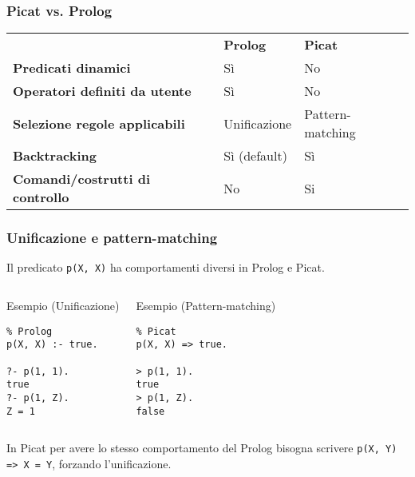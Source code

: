 \documentclass{beamer}
\begin{document}
\begin{frame}[fragile]
  \frametitle{Picat vs. Prolog}
  \begin{table}
    \begin{tabular}{l l l}
      & \textbf{Prolog} & \textbf{Picat} \\
      \addlinespace
      \textbf{Predicati dinamici} & Sì & No \\
      \textbf{Operatori definiti da utente} & Sì & No \\
      \textbf{Selezione regole applicabili} & Unificazione & Pattern-matching \\
      \textbf{Backtracking} & Sì (default) & Sì \\
      \textbf{Comandi/costrutti di controllo} & No & Si
    \end{tabular}
  \end{table}
\end{frame}


\begin{frame}[fragile]
  \frametitle{Unificazione e pattern-matching}
  
  Il predicato \texttt{p(X, X)} ha comportamenti diversi in Prolog e
  Picat.
  \begin{columns}[c]
    
    \begin{exampleblock}{Esempio (Unificazione)}
\begin{verbatim}
% Prolog
p(X, X) :- true.

?- p(1, 1).
true
?- p(1, Z).
Z = 1
\end{verbatim}
    \end{exampleblock}
    
    \begin{exampleblock}{Esempio (Pattern-matching)}
\begin{verbatim}
% Picat
p(X, X) => true.

> p(1, 1).
true
> p(1, Z).
false
\end{verbatim}
    \end{exampleblock}
  \end{columns}

  \medskip

  In Picat per avere lo stesso comportamento del Prolog bisogna
  scrivere \texttt{p(X, Y) => X = Y}, forzando l'unificazione.
\end{frame}
\end{document}
